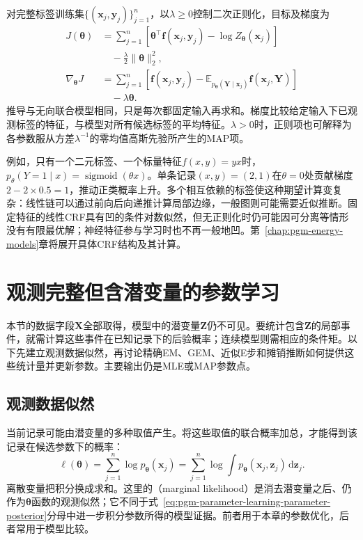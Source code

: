 对完整标签训练集$\{(\bm{x}_j,\bm{y}_j)\}_{j=1}^n$，以$\lambda\geq0$控制二次正则化，目标及梯度为
\begin{equation}
  \begin{aligned}
    J(\bm{\theta})
      &=\sum_{j=1}^n
        \left[\bm{\theta}^\top\bm{f}(\bm{x}_j,\bm{y}_j)
                    -\log Z_{\bm{\theta}}(\bm{x}_j)\right]\\
      &\quad-\frac{\lambda}{2}\lVert\bm{\theta}\rVert_2^2,\\
    \nabla_{\bm{\theta}}J
      &=\sum_{j=1}^n
        \left[\bm{f}(\bm{x}_j,\bm{y}_j)
          -\mathbb{E}_{p_{\bm{\theta}}(\bm{Y}\mid\bm{x}_j)}
             \bm{f}(\bm{x}_j,\bm{Y})\right]\\
      &\quad-\lambda\bm{\theta}.
  \end{aligned}
  \label{eq:pgm-parameter-learning-crf-gradient}
\end{equation}
推导与无向联合模型相同，只是每次都固定输入再求和。梯度比较给定输入下已观测标签的特征，与模型对所有候选标签的平均特征。$\lambda>0$时，正则项也可解释为各参数服从方差$\lambda^{-1}$的零均值高斯先验所产生的MAP项。

例如，只有一个二元标签、一个标量特征$f(x,y)=yx$时，$p_\theta(Y=1\mid x)=\operatorname{sigmoid}(\theta x)$。单条记录$(x,y)=(2,1)$在$\theta=0$处贡献梯度$2-2\times0.5=1$，推动正类概率上升。多个相互依赖的标签使这种期望计算变复杂：线性链可以通过前向后向递推计算局部边缘，一般图则可能需要近似推断。固定特征的线性CRF具有凹的条件对数似然，但无正则化时仍可能因可分离等情形没有有限最优解；神经特征参与学习时也不再一般地凹。第~\ref{chap:pgm-energy-models}章将展开具体CRF结构及其计算。

\section{观测完整但含潜变量的参数学习}
\label{sec:pgm-parameter-learning-latent}

本节的数据字段$\bm{X}$全部取得，模型中的潜变量$\bm{Z}$仍不可见。要统计包含$\bm{Z}$的局部事件，就需计算这些事件在已知记录下的后验概率；连续模型则需相应的条件矩。以下先建立观测数据似然，再讨论精确EM、GEM、近似E步和摊销推断如何提供这些统计量并更新参数。主要输出仍是MLE或MAP参数点。

\subsection{观测数据似然}
\label{sec:pgm-parameter-learning-marginal-likelihood}

当前记录可能由潜变量的多种取值产生。将这些取值的联合概率加总，才能得到该记录在候选参数下的概率：
\begin{equation}
  \ell(\bm{\theta})
    =\sum_{j=1}^n\log p_{\bm{\theta}}(\bm{x}_j)
    =\sum_{j=1}^n
       \log\int p_{\bm{\theta}}(\bm{x}_j,\bm{z}_j)
                         \,\mathrm{d}\bm{z}_j.
  \label{eq:pgm-parameter-learning-observed-likelihood}
\end{equation}
离散变量把积分换成求和。这里的（marginal likelihood）是消去潜变量之后、仍作为$\bm{\theta}$函数的观测似然；它不同于式~\eqref{eq:pgm-parameter-learning-parameter-posterior}分母中进一步积分参数所得的模型证据。前者用于本章的参数优化，后者常用于模型比较。

